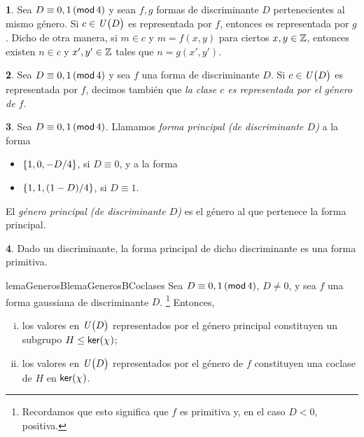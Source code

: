 \theoremstyle{plain}
\newtheorem{teoGenerosB}{\teoname}[section]
\newtheorem{lemaGenerosB}[teoGenerosB]{\lemaname}
\newtheorem{coroGenerosB}[teoGenerosB]{\coroname}

\theoremstyle{definition}
\newtheorem{obsGenerosB}[teoGenerosB]{\obsname}
\newtheorem{defGenerosB}[teoGenerosB]{}


\begin{obsGenerosB}\label{obs:generos:representacion}
	Sea $D\equiv 0,1\tmodulo[4]$ y sean $f,g$ formas
	de discriminante $D$ pertenecientes al mismo g\'enero.
	Si $c\in\Unidadesmod[D]$ es representada por $f$, entonces
	es representada por $g$. Dicho de otra manera, si
	$m\in c$ y $m=f(x,y)$ para ciertos $x,y\in\Enteros$, entonces
	existen $n\in c$ y $x',y'\in\Enteros$ tales que
	$n=g(x',y')$.
\end{obsGenerosB}

\begin{defGenerosB}\label{def:generos:representacion}
	Sea $D\equiv 0,1\tmodulo[4]$ y sea $f$ una forma
	de discriminante $D$. Si $c\in\Unidadesmod[D]$ es
	representada por $f$, decimos tambi\'en que
	\emph{la clase $c$ es representada por el g\'enero de $f$}.
\end{defGenerosB}

\begin{defGenerosB}\label{def:generos:principal}
	Sea $D\equiv 0,1\tmodulo[4]$. Llamamos
	\emph{forma principal (de discriminante $D$)} a la forma
	\begin{itemize}
		\item $\binaria{1,0,-D/4}$, si $D\equiv 0$, y a la forma
		\item $\binaria{1,1,(1-D)/4}$, si $D\equiv 1$.
	\end{itemize}
	El \emph{g\'enero principal (de discriminante $D$)} es el
	g\'enero al que pertenece la forma principal.
\end{defGenerosB}

\begin{obsGenerosB}\label{obs:generos:principal}
	Dado un discriminante, la forma principal de dicho discriminante
	es una forma primitiva.
\end{obsGenerosB}

\begin{restatable}{lemaGenerosB}{lemaGenerosBCoclases}
	\label{lema:generos}
	Sea $D\equiv 0,1\tmodulo[4]$, $D\neq 0$, y sea
	$f$ una forma gaussiana de discriminante $D$.%
	\footnote{
		Recordamos que esto significa que $f$ es
		primitiva y, en el caso $D<0$, positiva.
	}
	Entonces,
	\begin{enumerate}[(i)]
		\item\label{item:lema:generos:principal}
			los valores en $\Unidadesmod[D]$ representados por
			el g\'enero principal constituyen un subgrupo
			$H\subgrpeq\ker(\varkronecker)$;
		\item\label{item:lema:generos:coclases}
			los valores en $\Unidadesmod[D]$ representados por
			el g\'enero de $f$ constituyen una coclase de $H$
			en $\ker(\varkronecker)$.
	\end{enumerate}
\end{restatable}

